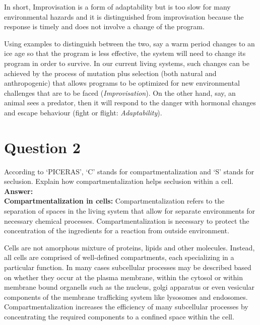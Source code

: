 \documentclass[11pt]{scrartcl}
\begin{document}
		In short, Improvisation is a form of adaptability but is too slow for many environmental hazards and it is distinguished from improvisation because the response is timely and does not involve a change of the program. 
		
		Using examples to  distinguish between the two, say a warm period changes to an ice age so that the program is less effective, the system will need to change its program in order to survive. In our current living systems, such changes can be achieved by the process of mutation plus selection (both natural and anthropogenic) that allows programs to be optimized for new environmental challenges that are to be faced (\emph{Improvisation}). On the other hand, say, an animal sees a predator, then it will respond to the danger with hormonal changes and escape behaviour (fight or flight: \emph{Adaptability}). \cite{Dan} \cite{TKS}
		
		\pagebreak
		
		\section{Question 2}
		
		According to ‘PICERAS’, ‘C’ stands for compartmentalization and ‘S’ stands for seclusion. Explain how compartmentalization helps seclusion within a cell.\\[2pt]
		
		\textbf{Answer:}\\[2pt]
		
		\textbf{Compartmentalization in cells: }Compartmentalization refers to the separation of spaces in the living system that allow for separate environments for necessary chemical processes. Compartmentalization is necessary to protect the concentration of the ingredients for a reaction from outside environment.
		
		Cells are not amorphous mixture of proteins, lipids and other molecules. Instead, all cells are comprised of well-defined compartments, each specializing in a particular function. In many cases subcellular processes may be described based on whether they occur at the plasma membrane, within the cytosol or within membrane bound organells such as the nucleus, golgi apparatus or even vesicular components of the membrane trafficking system like lysosomes and endosomes. Compartmentalization increases the efficiency of many subcellular processes by concentrating the required components to a confined space within the cell.
		
\end{document}
